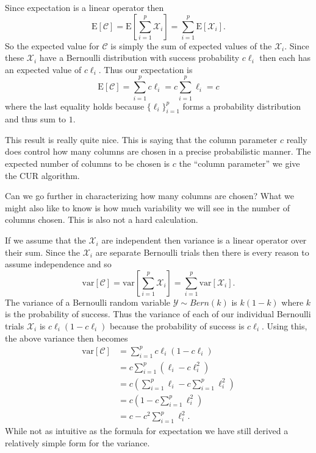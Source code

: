 \documentclass{book}
\newcommand{\e}[1]{\text{E}\left[#1\right]}
\begin{document}
\vspace{.5cm}{\bf Expectation} \vspace{.5cm}

Since expectation is a linear operator then 
$$
\text{E}[\mathscr{C}] = \text{E}\left[\sum_{i=1}^{p}\mathscr{X}_i\right]=\sum_{i=1}^{p}\text{E}[\mathscr{X}_i].
$$
So the expected value for $\mathscr{C}$ is simply the sum of expected values of the $\mathscr{X}_i$. Since these $\mathscr{X}_i$ have a Bernoulli distribution with success probability $c\ell_i$ then each has an expected value of $c\ell_i$. Thus our expectation is 
$$
\e{\mathcal{C}}=\sum_{i=1}^{p}c\ell_i=c\sum_{i=1}^p\ell_i=c
$$
where the last equality holds because $\{\ell_i\}_{i=1}^{p}$ forms a probability distribution and thus sum to $1$.

This result is really quite nice. This is saying that the column parameter $c$ really does control how many columns are chosen in a precise probabilistic  manner. The expected number of columns to be chosen is $c$ the ``column parameter'' we give the CUR algorithm. 

\vspace{.5cm}{\bf Variance}\vspace{.5cm} 

Can we go further in characterizing how many columns are chosen? What we might also like to know is how much variability we will see in the number of columns chosen. This is also not a hard calculation. 

If we assume that the $\mathscr{X}_i$ are independent then variance is a linear operator over their sum. Since the $\mathscr{X}_i$ are separate Bernoulli trials then there is every reason to assume independence and so
$$
\text{var}\left[\mathscr{C}\right]=\text{var}\left[\sum_{i=1}^{p}\mathscr{X}_i\right]=\sum_{i=1}^{p}\text{var}\left[\mathscr{X}_i\right].
$$ 
The variance of a Bernoulli random variable $\mathscr{Y} \sim Bern(k)$ is $k(1-k)$ where $k$ is the probability of success. Thus the variance of each of our individual Bernoulli trials $\mathscr{X}_i$ is $c\ell_i(1-c\ell_i)$ because the probability of success is $c\ell_i$. Using this, the above variance then becomes 
$$
\begin{aligned}
\text{var}\left[\mathscr{C}\right]&=\sum_{i=1}^{p}c\ell_i(1-c\ell_i)\\
&=c\sum_{i=1}^{p}(\ell_i-c\ell_i^2)\\
&=c\left(\sum_{i=1}^{p}\ell_i-c\sum_{i=1}^{p}\ell_i^2\right)\\
&=c\left(1-c\sum_{i=1}^{p}\ell_i^2\right)\\
&=c-c^2\sum_{i=1}^{p}\ell_i^2.
\end{aligned}
$$
While not as intuitive as the formula for expectation we have still derived a relatively simple form for the variance. 
\end{document}
